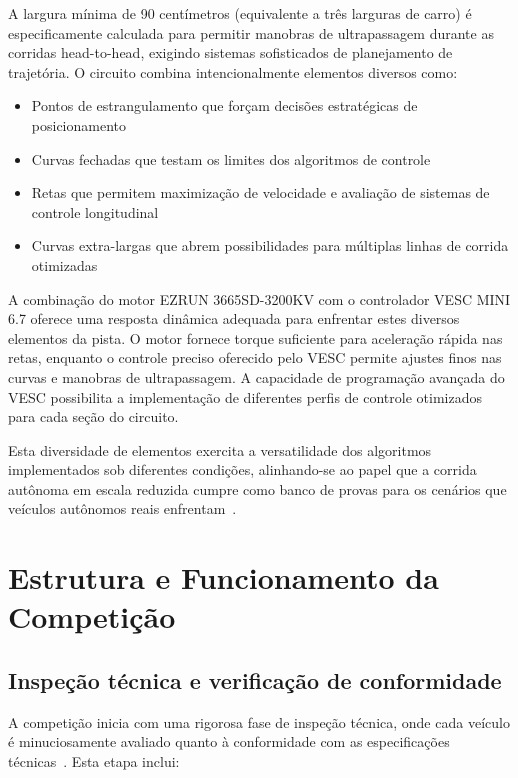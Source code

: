 A largura mínima de 90 centímetros (equivalente a três larguras de carro) é
especificamente calculada para permitir manobras de ultrapassagem durante as
corridas head-to-head, exigindo sistemas sofisticados de planejamento de
trajetória. O circuito combina intencionalmente elementos diversos como:

\begin{itemize}
      \item Pontos de estrangulamento que forçam decisões estratégicas de posicionamento
      \item Curvas fechadas que testam os limites dos algoritmos de controle
      \item Retas que permitem maximização de velocidade e avaliação de sistemas de
            controle longitudinal
      \item Curvas extra-largas que abrem possibilidades para múltiplas linhas de corrida
            otimizadas
\end{itemize}

A combinação do motor EZRUN 3665SD-3200KV com o controlador VESC MINI 6.7
oferece uma resposta dinâmica adequada para enfrentar estes diversos elementos
da pista. O motor fornece torque suficiente para aceleração rápida nas retas,
enquanto o controle preciso oferecido pelo VESC permite ajustes finos nas
curvas e manobras de ultrapassagem. A capacidade de programação avançada do
VESC possibilita a implementação de diferentes perfis de controle otimizados
para cada seção do circuito.

Esta diversidade de elementos exercita a versatilidade dos algoritmos
implementados sob diferentes condições, alinhando-se ao papel que a corrida
autônoma em escala reduzida cumpre como banco de provas para os cenários que
veículos autônomos reais enfrentam~\cite{OKelly2020F1TENTH,Betz2022Survey}.

\section{Estrutura e Funcionamento da Competição}

\subsection{Inspeção técnica e verificação de conformidade}

A competição inicia com uma rigorosa fase de inspeção técnica, onde cada
veículo é minuciosamente avaliado quanto à conformidade com as especificações
técnicas~\cite{F1TENTHRules2023}. Esta etapa inclui:

